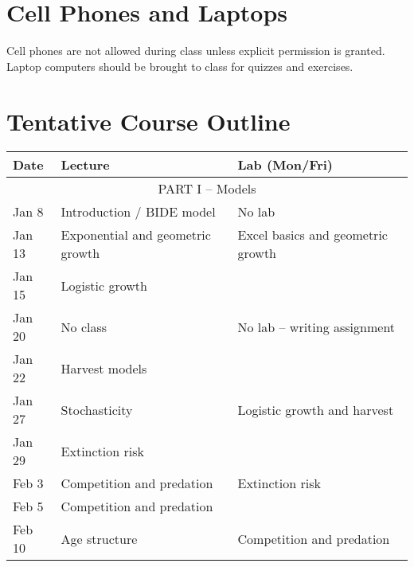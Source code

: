 \documentclass[11pt]{article}
\begin{document}
\vspace{-5mm}
\section*{Cell Phones and Laptops}
\vspace{-2mm}
Cell phones are not allowed during class unless explicit permission is
granted. Laptop computers should be brought to class for quizzes and
exercises.



\section*{Tentative Course Outline}
\large

\begin{center}
\begin{tabular}[c]{lll}
\hline \hline
{\bf Date} & {\bf Lecture}                      & {\bf Lab (Mon/Fri)}               \\
\hline
           \multicolumn{3}{c}{PART I -- Models}                                     \\
\hline
Jan 8      & Introduction / BIDE model          & No lab                            \\
\hline
Jan 13     & Exponential and geometric growth   & Excel basics and geometric growth \\
Jan 15     & Logistic growth                    &                                   \\
\hline
Jan 20     & No class                           & No lab -- writing assignment      \\
Jan 22     & Harvest models                     &                                   \\
\hline
Jan 27     & Stochasticity                      & Logistic growth and harvest       \\
Jan 29     & Extinction risk                    &                                   \\
\hline
Feb 3      & Competition and predation          & Extinction risk                   \\
Feb 5      & Competition and predation          &                                   \\
\hline
Feb 10     & Age structure                      & Competition and predation         \\

\end{tabular}
\end{center}
\end{document}
